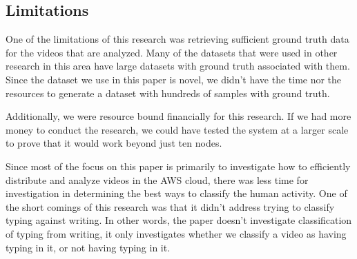 \subsection{Limitations}
One of the limitations of this research was retrieving sufficient ground truth
data for the videos that are analyzed. Many of the datasets that were
used in other research in this area have large datasets with ground truth
associated with them. Since the dataset we use in this paper is novel, we didn't
have the time nor the resources to generate a dataset with hundreds of samples
with ground truth.

Additionally, we were resource bound financially for this research. If we had more
money to conduct the research, we could have tested the system at a larger
scale to prove that it would work beyond just ten nodes.

Since most of the focus on this paper is primarily to investigate how to
efficiently distribute and analyze videos in the AWS cloud, there was less time
for investigation in determining the best ways to classify the human activity.
One of the short comings of this research was that it didn't address trying to
classify typing against writing. In other words, the paper doesn't investigate
classification of typing from writing, it only investigates whether we classify
a video as having typing in it, or not having typing in it.





